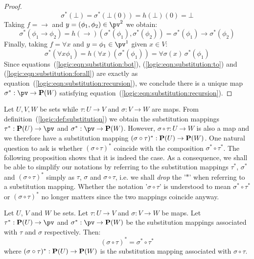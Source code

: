 \begin{proof}
\begin{equation}
        \sigma^{*}(\bot)=\sigma^{*}(\bot(0))=h(\bot)(0)=\bot
    \end{equation}
    Taking $f=\to$ and $y=(\phi_{1},\phi_{2})\in\pv^{2}$ we obtain:
    \begin{equation}\label{logic:eqn:substitution:to}
        \sigma^{*}(\phi_{1}\to\phi_{2})
        =
        h(\to)(\sigma^{*}(\phi_{1}),\sigma^{*}(\phi_{2}))
        =
        \sigma^{*}(\phi_{1})\to\sigma^{*}(\phi_{2})
    \end{equation}
    Finally, taking $f=\forall x$ and $y=\phi_{1}\in\pv^{1}$ given $x\in V$:
    \begin{equation}\label{logic:eqn:substitution:forall}
        \sigma^{*}(\forall x\phi_{1})
        =
        h(\forall x)(\sigma^{*}(\phi_{1}))
        =
        \forall\sigma(x)\,\sigma^{*}(\phi_{1})
    \end{equation}
    Since equations~(\ref{logic:eqn:substitution:bot}),
    (\ref{logic:eqn:substitution:to}) and
    (\ref{logic:eqn:substitution:forall}) are exactly as
    equation~(\ref{logic:eqn:substitution:recursion}), we conclude there
    is a unique map $\sigma^{*}:\pv\to{\bf P}(W)$ satisfying
    equation~(\ref{logic:eqn:substitution:recursion}).
\end{proof}
Let $U,V,W$ be sets while $\tau:U\to V$ and $\sigma:V\to W$ are
maps. From definition~(\ref{logic:def:substitution}) we obtain the
substitution mappings $\tau^{*}:{\bf P}(U)\to\pv$ and
$\sigma^{*}:\pv\to{\bf P}(W)$. However, $\sigma\circ\tau:U\to W$ is
also a map and we therefore have a substitution mapping
$(\sigma\circ\tau)^{*}:{\bf P}(U)\to{\bf P}(W)$. One natural
question to ask is whether $(\sigma\circ\tau)^{*}$ coincide with the
composition $\sigma^{*}\circ\tau^{*}$. The following proposition
shows that it is indeed the case. As a consequence, we shall be able
to simplify our notations by referring to the substitution mappings
$\tau^{*}$, $\sigma^{*}$ and $(\sigma\circ\tau)^{*}$ simply as
$\tau$, $\sigma$ and $\sigma\circ\tau$, i.e.  we shall {\em drop}
the '$*$' when referring to a substitution mapping. Whether the
notation '$\sigma\circ\tau$' is understood to mean
$\sigma^{*}\circ\tau^{*}$ or $(\sigma\circ\tau)^{*}$ no longer
matters since the two mappings coincide anyway.
\begin{prop}\label{logic:prop:substitution:composition}
    Let $U$, $V$ and $W$ be sets. Let $\tau:U\to V$ and $\sigma:V\to W$
    be maps. Let $\tau^{*}:{\bf P}(U)\to\pv$ and $\sigma^{*}:\pv\to{\bf
    P}(W)$ be the substitution mappings associated with $\tau$ and
    $\sigma$ respectively. Then:
    \[
        (\sigma\circ\tau)^{*}
        =
        \sigma^{*}\circ\tau^{*}
    \]
    where $(\sigma\circ\tau)^{*}:{\bf P}(U)\to {\bf P}(W)$ is the
    substitution mapping associated with $\sigma\circ\tau$.
\end{prop}

